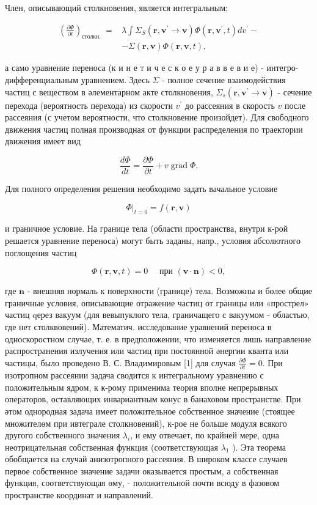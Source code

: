 \documentclass[10pt]{article}
\begin{document}
Член, описывающий столкновения, является интегральным:

\[
\begin{aligned}
\left(\frac{\partial \Phi}{\partial t}\right)_{\text {столкн. }}= & \lambda \int \Sigma_{S}\left(\boldsymbol{r}, \boldsymbol{v}^{\prime} \longrightarrow \boldsymbol{v}\right) \Phi\left(\boldsymbol{r}, \boldsymbol{v}^{\prime}, t\right) d v^{\prime}- \\
& -\Sigma(\boldsymbol{r}, \boldsymbol{v}) \Phi(\boldsymbol{r}, \boldsymbol{v}, t),
\end{aligned}
\]

а само уравнение переноса (к и н е т и ч е с к о е у р а в в е в и е) - интегро-дифференциальным уравнением. Здесь $\Sigma$ - полное сечение взаимодействия частиц с веществом в әлементарном акте столкновения, $\Sigma_{s}\left(\boldsymbol{r}, \boldsymbol{v}^{\prime} \rightarrow \boldsymbol{v}\right)$ - сечение перехода (вероятность перехода) из скорости $v^{\prime}$ до рассеяния в скорость $v$ после рассеяния (с учетом вероятности, что столкновение произойдет). Для свободного движения частиц полная производная от функции распределения по траектории движения имеет вид

\[
\frac{d \Phi}{d t}=\frac{\partial \Phi}{\partial t}+v \operatorname{grad} \Phi .
\]

Для полного определения решения необходимо задать вачальное условие

\[
\left.\Phi\right|_{t=0}=f(\boldsymbol{r}, \boldsymbol{v})
\]

и граничное условие. На границе тела (области пространства, внутри к-рой решается уравнение переноса) могут быть заданы, напр., условия абсолютного поглощения частиц

\[
\Phi(\boldsymbol{r}, \boldsymbol{v}, t)=0 \quad \text { при }(\boldsymbol{v} \cdot \boldsymbol{n})<0,
\]

где $\boldsymbol{n}$ - внешняя нормаль к поверхности (границе) тела. Возможны и более общие граничные условия, описывающие отражение частиц от границы или «прострел» частиц qерез вакуум (для вевыпуклого тела, граничащего с вакуумом - областью, где нет столквовений). Математич. исследование уравнений переноса в односкоростном случае, т. е. в предположении, что изменяется лишь направление распространения излучения или частиц при постоянной әнергии кванта или частицы, было проведено В. С. Владимировым [1] для случая $\frac{\partial \Phi}{\partial t}=0$. При изотропном рассеянии задача сводится к интегральному уравнению с положительным ядром, к к-рому применима теория вполне непрерывных операторов, оставляющих инвариантным конус в банаховом пространстве. При әтом однородная задача имеет положительное собственное значение (стоящее множителөм при ивтеграле столкновений), к-рое не больше модуля всякого другого собственного значения $\lambda_{i}$, и ему отвечает, по крайней мере, одна неотрицательная собственная функция (соответствующая $\lambda_{1}$ ). Эта теорема обобщается на случай анизотропного рассеяния. В широком классе случаев первое собственное значение задачи оказывается простым, а собственная функция, соответствующая өму, - положительной почти всюду в фазовом пространстве координат и направлений.
\end{document}
